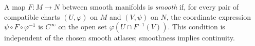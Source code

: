 
A map $F:M\to N$ between smooth manifolds is \emph{smooth} if, for every pair of compatible charts $(U,\varphi)$ on $M$ and $(V,\psi)$ on $N$, the coordinate expression $\psi\circ F\circ\varphi^{-1}$ is $C^\infty$ on the open set $\varphi(U\cap F^{-1}(V))$. This condition is independent of the chosen smooth atlases; smoothness implies continuity.
